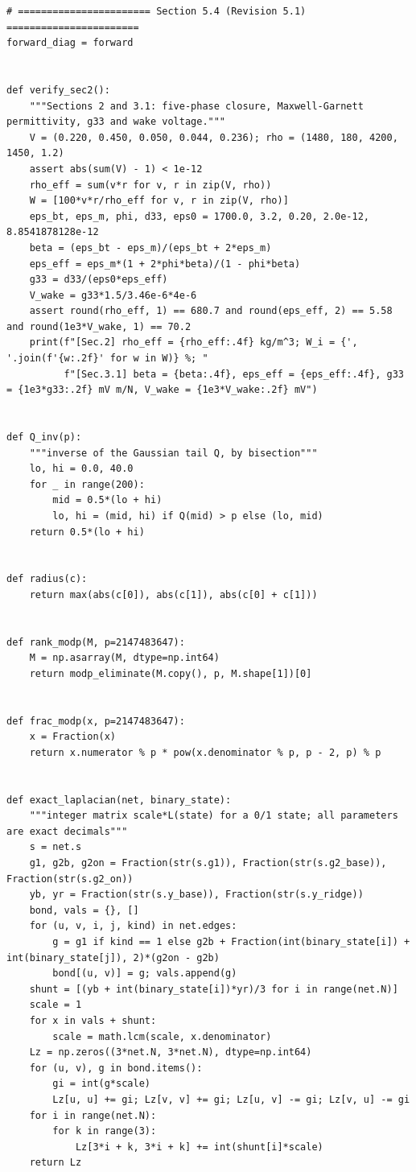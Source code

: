 \documentclass[11pt,a4paper]{article}
\theoremstyle{definition}
\theoremstyle{remark}
\begin{document}
\begin{lstlisting}
# ======================= Section 5.4 (Revision 5.1) =======================
forward_diag = forward


def verify_sec2():
    """Sections 2 and 3.1: five-phase closure, Maxwell-Garnett permittivity, g33 and wake voltage."""
    V = (0.220, 0.450, 0.050, 0.044, 0.236); rho = (1480, 180, 4200, 1450, 1.2)
    assert abs(sum(V) - 1) < 1e-12
    rho_eff = sum(v*r for v, r in zip(V, rho))
    W = [100*v*r/rho_eff for v, r in zip(V, rho)]
    eps_bt, eps_m, phi, d33, eps0 = 1700.0, 3.2, 0.20, 2.0e-12, 8.8541878128e-12
    beta = (eps_bt - eps_m)/(eps_bt + 2*eps_m)
    eps_eff = eps_m*(1 + 2*phi*beta)/(1 - phi*beta)
    g33 = d33/(eps0*eps_eff)
    V_wake = g33*1.5/3.46e-6*4e-6
    assert round(rho_eff, 1) == 680.7 and round(eps_eff, 2) == 5.58 and round(1e3*V_wake, 1) == 70.2
    print(f"[Sec.2] rho_eff = {rho_eff:.4f} kg/m^3; W_i = {', '.join(f'{w:.2f}' for w in W)} %; "
          f"[Sec.3.1] beta = {beta:.4f}, eps_eff = {eps_eff:.4f}, g33 = {1e3*g33:.2f} mV m/N, V_wake = {1e3*V_wake:.2f} mV")


def Q_inv(p):
    """inverse of the Gaussian tail Q, by bisection"""
    lo, hi = 0.0, 40.0
    for _ in range(200):
        mid = 0.5*(lo + hi)
        lo, hi = (mid, hi) if Q(mid) > p else (lo, mid)
    return 0.5*(lo + hi)


def radius(c):
    return max(abs(c[0]), abs(c[1]), abs(c[0] + c[1]))


def rank_modp(M, p=2147483647):
    M = np.asarray(M, dtype=np.int64)
    return modp_eliminate(M.copy(), p, M.shape[1])[0]


def frac_modp(x, p=2147483647):
    x = Fraction(x)
    return x.numerator % p * pow(x.denominator % p, p - 2, p) % p


def exact_laplacian(net, binary_state):
    """integer matrix scale*L(state) for a 0/1 state; all parameters are exact decimals"""
    s = net.s
    g1, g2b, g2on = Fraction(str(s.g1)), Fraction(str(s.g2_base)), Fraction(str(s.g2_on))
    yb, yr = Fraction(str(s.y_base)), Fraction(str(s.y_ridge))
    bond, vals = {}, []
    for (u, v, i, j, kind) in net.edges:
        g = g1 if kind == 1 else g2b + Fraction(int(binary_state[i]) + int(binary_state[j]), 2)*(g2on - g2b)
        bond[(u, v)] = g; vals.append(g)
    shunt = [(yb + int(binary_state[i])*yr)/3 for i in range(net.N)]
    scale = 1
    for x in vals + shunt:
        scale = math.lcm(scale, x.denominator)
    Lz = np.zeros((3*net.N, 3*net.N), dtype=np.int64)
    for (u, v), g in bond.items():
        gi = int(g*scale)
        Lz[u, u] += gi; Lz[v, v] += gi; Lz[u, v] -= gi; Lz[v, u] -= gi
    for i in range(net.N):
        for k in range(3):
            Lz[3*i + k, 3*i + k] += int(shunt[i]*scale)
    return Lz



\end{lstlisting}
\end{document}
